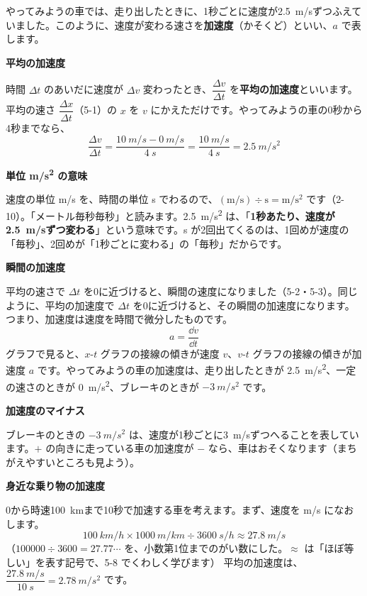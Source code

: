 \vspace{2pt}


\leavevmode\label{bk:5-5:kasokudo}やってみようの車では、走り出したときに、1秒ごとに速度が\qty{2.5}{m/s}ずつふえていました。このように、速度が変わる速さを\textbf{加速度}（かそくど）といい、$a$ で表します。

\noindent\textbf{平均の加速度}\par
\noindent 時間 $\Delta t$ のあいだに速度が $\Delta v$ 変わったとき、$\dfrac{\Delta v}{\Delta t}$ を\textbf{平均の加速度}といいます。平均の速さ $\dfrac{\Delta x}{\Delta t}$（5-1）の $x$ を $v$ にかえただけです。やってみようの車の0秒から4秒までなら、
\[ \frac{\Delta v}{\Delta t}=\frac{\qty{10}{m/s}-\qty{0}{m/s}}{\qty{4}{s}}=\frac{\qty{10}{m/s}}{\qty{4}{s}}=\qty{2.5}{m/s^2} \]

\noindent\textbf{単位 \unit{m/s^2} の意味}\par
\noindent 速度の単位 m/s を、時間の単位 s でわるので、$(\mathrm{m/s})\div\mathrm{s}=\mathrm{m/s^2}$ です（2-10）。「メートル毎秒毎秒」と読みます。\qty{2.5}{m/s^2} は、「\textbf{1秒あたり、速度が\qty{2.5}{m/s}ずつ変わる}」という意味です。s が2回出てくるのは、1回めが速度の「毎秒」、2回めが「1秒ごとに変わる」の「毎秒」だからです。

\noindent\textbf{瞬間の加速度}\par
\noindent 平均の速さで $\Delta t$ を0に近づけると、瞬間の速度になりました（5-2・5-3）。同じように、平均の加速度で $\Delta t$ を0に近づけると、その瞬間の加速度になります。つまり、加速度は速度を時間で微分したものです。
\[ a=\frac{\dd v}{\dd t} \]
グラフで見ると、$x$-$t$ グラフの接線の傾きが速度 $v$、$v$-$t$ グラフの接線の傾きが加速度 $a$ です。やってみようの車の加速度は、走り出したときが \qty{2.5}{m/s^2}、一定の速さのときが \qty{0}{m/s^2}、ブレーキのときが $\qty{-3}{m/s^2}$ です。

\noindent\textbf{加速度のマイナス}\par
\noindent ブレーキのときの $\qty{-3}{m/s^2}$ は、速度が1秒ごとに\qty{3}{m/s}ずつへることを表しています。$+$ の向きに走っている車の加速度が $-$ なら、車はおそくなります（まちがえやすいところも見よう）。

\noindent\textbf{身近な乗り物の加速度}\par
\noindent 0から時速\qty{100}{km}まで10秒で加速する車を考えます。まず、速度を m/s になおします。
\[ \qty{100}{km/h}\times\qty{1000}{m/km}\div\qty{3600}{s/h}\approx\qty{27.8}{m/s} \]
（$100000\div3600=27.77\cdots$ を、小数第1位までのがい数にした。$\approx$ は「ほぼ等しい」を表す記号で、5-8 でくわしく学びます）
平均の加速度は、$\dfrac{\qty{27.8}{m/s}}{\qty{10}{s}}=\qty{2.78}{m/s^2}$ です。

